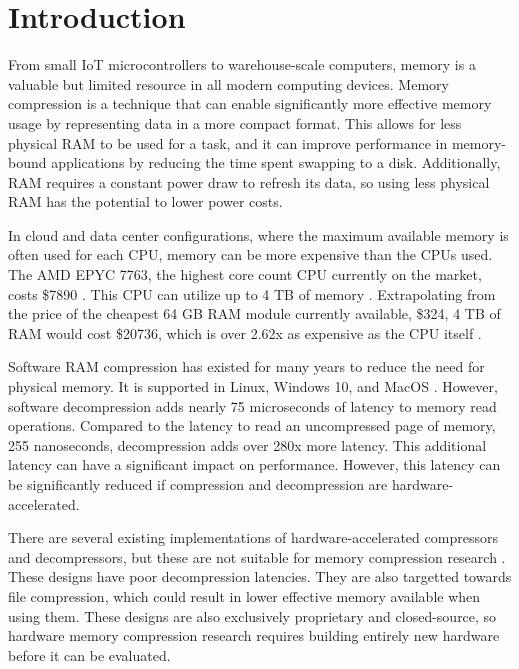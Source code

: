 \documentclass[doublespace,nopageskip]{VTthesis}
\begin{document}
\chapter{Introduction} \label{ch:introduction}
From small IoT microcontrollers to warehouse-scale computers, memory is a valuable but limited resource in all modern computing devices. Memory compression is a technique that can enable significantly more effective memory usage by representing data in a more compact format. This allows for less physical RAM to be used for a task, and it can improve performance in memory-bound applications by reducing the time spent swapping to a disk. Additionally, RAM requires a constant power draw to refresh its data, so using less physical RAM has the potential to lower power costs.

In cloud and data center configurations, where the maximum available memory is often used for each CPU, memory can be more expensive than the CPUs used. The AMD EPYC 7763, the highest core count CPU currently on the market, costs \$7890 \cite{epyc_price}. This CPU can utilize up to 4 TB of memory \cite{ibm_epyc}. Extrapolating from the price of the cheapest 64 GB RAM module currently available, \$324, 4 TB of RAM would cost \$20736, which is over 2.62x as expensive as the CPU itself \cite{memory_price}.

Software RAM compression has existed for many years to reduce the need for physical memory. It is supported in Linux, Windows 10, and MacOS \cite{linux_memory_compression, windows10_memory_compression, macos_memory_compression}. However, software decompression adds nearly 75 microseconds of latency to memory read operations. Compared to the latency to read an uncompressed page of memory, 255 nanoseconds, decompression adds over 280x more latency. This additional latency can have a significant impact on performance. However, this latency can be significantly reduced if compression and decompression are hardware-accelerated.

There are several existing implementations of hardware-accelerated compressors and decompressors, but these are not suitable for memory compression research \cite{ibm,microsoft}. These designs have poor decompression latencies. They are also targetted towards file compression, which could result in lower effective memory available when using them. These designs are also exclusively proprietary and closed-source, so hardware memory compression research requires building entirely new hardware before it can be evaluated.
\end{document}
